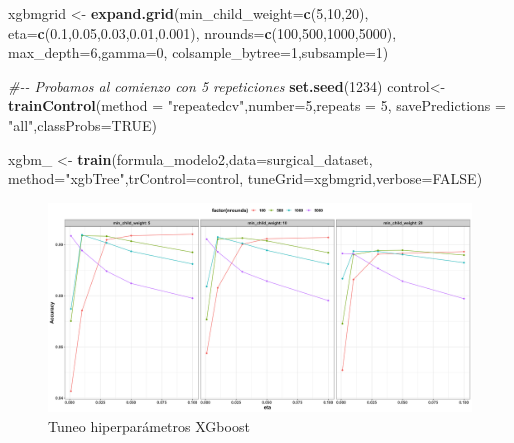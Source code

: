 \documentclass[
]{article}
\newenvironment{Shaded}{\begin{snugshade}}{\end{snugshade}}
\newcommand{\CommentTok}[1]{\textcolor[rgb]{0.56,0.35,0.01}{\textit{#1}}}
\newcommand{\DataTypeTok}[1]{\textcolor[rgb]{0.13,0.29,0.53}{#1}}
\newcommand{\DecValTok}[1]{\textcolor[rgb]{0.00,0.00,0.81}{#1}}
\newcommand{\FloatTok}[1]{\textcolor[rgb]{0.00,0.00,0.81}{#1}}
\newcommand{\KeywordTok}[1]{\textcolor[rgb]{0.13,0.29,0.53}{\textbf{#1}}}
\newcommand{\NormalTok}[1]{#1}
\newcommand{\OtherTok}[1]{\textcolor[rgb]{0.56,0.35,0.01}{#1}}
\newcommand{\StringTok}[1]{\textcolor[rgb]{0.31,0.60,0.02}{#1}}
\begin{document}
\begin{Shaded}
\begin{Highlighting}[]
\NormalTok{xgbmgrid <{-}}\StringTok{ }\KeywordTok{expand.grid}\NormalTok{(}\DataTypeTok{min\_child\_weight=}\KeywordTok{c}\NormalTok{(}\DecValTok{5}\NormalTok{,}\DecValTok{10}\NormalTok{,}\DecValTok{20}\NormalTok{),}
                        \DataTypeTok{eta=}\KeywordTok{c}\NormalTok{(}\FloatTok{0.1}\NormalTok{,}\FloatTok{0.05}\NormalTok{,}\FloatTok{0.03}\NormalTok{,}\FloatTok{0.01}\NormalTok{,}\FloatTok{0.001}\NormalTok{), }
                        \DataTypeTok{nrounds=}\KeywordTok{c}\NormalTok{(}\DecValTok{100}\NormalTok{,}\DecValTok{500}\NormalTok{,}\DecValTok{1000}\NormalTok{,}\DecValTok{5000}\NormalTok{),}
                        \DataTypeTok{max\_depth=}\DecValTok{6}\NormalTok{,}\DataTypeTok{gamma=}\DecValTok{0}\NormalTok{,}
                        \DataTypeTok{colsample\_bytree=}\DecValTok{1}\NormalTok{,}\DataTypeTok{subsample=}\DecValTok{1}\NormalTok{)}

\CommentTok{\#{-}{-} Probamos al comienzo con 5 repeticiones}
\KeywordTok{set.seed}\NormalTok{(}\DecValTok{1234}\NormalTok{)}
\NormalTok{control<{-}}\KeywordTok{trainControl}\NormalTok{(}\DataTypeTok{method =} \StringTok{"repeatedcv"}\NormalTok{,}\DataTypeTok{number=}\DecValTok{5}\NormalTok{,}\DataTypeTok{repeats =} \DecValTok{5}\NormalTok{,}
                      \DataTypeTok{savePredictions =} \StringTok{"all"}\NormalTok{,}\DataTypeTok{classProbs=}\OtherTok{TRUE}\NormalTok{)}

\NormalTok{xgbm\_ <{-}}\StringTok{ }\KeywordTok{train}\NormalTok{(formula\_modelo2,}\DataTypeTok{data=}\NormalTok{surgical\_dataset,}
               \DataTypeTok{method=}\StringTok{"xgbTree"}\NormalTok{,}\DataTypeTok{trControl=}\NormalTok{control,}
               \DataTypeTok{tuneGrid=}\NormalTok{xgbmgrid,}\DataTypeTok{verbose=}\OtherTok{FALSE}\NormalTok{)}
\end{Highlighting}
\end{Shaded}

\begin{figure}[h!]

{\centering \includegraphics[width=0.99\linewidth,height=0.99\textheight,]{./charts/xgboost/tuneo_xgboost_modelo2} 

}

\caption{Tuneo hiperparámetros XGboost}\label{fig:unnamed-chunk-131}
\end{figure}
\end{document}
